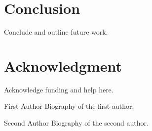\documentclass[journal]{IEEEtran}
\begin{document}
\section{Conclusion}
Conclude and outline future work.

\section*{Acknowledgment}
Acknowledge funding and help here.



\begin{IEEEbiographynophoto}{First Author}
Biography of the first author.
\end{IEEEbiographynophoto}

\begin{IEEEbiographynophoto}{Second Author}
Biography of the second author.
\end{IEEEbiographynophoto}
\end{document}
